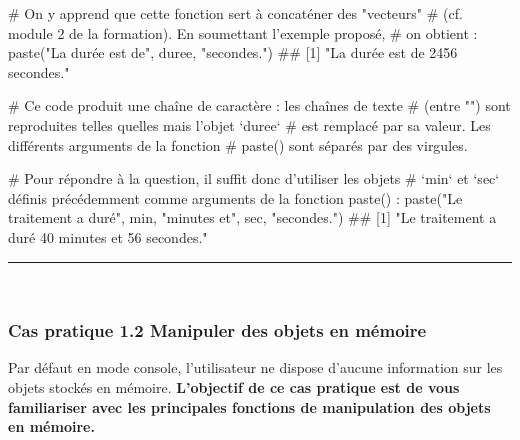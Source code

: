 \documentclass[12pt,twosided, notitlepage]{book}
\newenvironment{Shaded}{}{}
\newcommand{\KeywordTok}[1]{\textcolor[rgb]{0.00,0.00,1.00}{#1}}
\newcommand{\StringTok}[1]{\textcolor[rgb]{0.00,0.50,0.50}{#1}}
\newcommand{\CommentTok}[1]{\textcolor[rgb]{0.00,0.50,0.00}{#1}}
\newcommand{\NormalTok}[1]{#1}
\renewenvironment{Shaded}{\begin{snugshade}}{\end{snugshade}}
\begin{document}
\begin{enumerate}
\begin{Shaded}
\begin{Highlighting}[]
\CommentTok{# On y apprend que cette fonction sert à concaténer des "vecteurs"}
\CommentTok{# (cf. module 2 de la formation). En soumettant l'exemple proposé,}
\CommentTok{# on obtient :}
\KeywordTok{paste}\NormalTok{(}\StringTok{"La durée est de"}\NormalTok{, duree, }\StringTok{"secondes."}\NormalTok{)}
\NormalTok{  ## [1] "La durée est de 2456 secondes."}

\CommentTok{# Ce code produit une chaîne de caractère : les chaînes de texte}
\CommentTok{# (entre "") sont reproduites telles quelles mais l'objet `duree`}
\CommentTok{# est remplacé par sa valeur. Les différents arguments de la fonction}
\CommentTok{# paste() sont séparés par des virgules.}

\CommentTok{# Pour répondre à la question, il suffit donc d'utiliser les objets}
\CommentTok{# `min` et `sec` définis précédemment comme arguments de la fonction paste() :}
\KeywordTok{paste}\NormalTok{(}\StringTok{"Le traitement a duré"}\NormalTok{, min, }\StringTok{"minutes et"}\NormalTok{, sec, }\StringTok{"secondes."}\NormalTok{)}
\NormalTok{  ## [1] "Le traitement a duré 40 minutes et 56 secondes."}
\end{Highlighting}
\end{Shaded}

  \begin{center} \rule{0.5\linewidth}{\linethickness}\end{center}

  \bigskip  \fi 
\end{enumerate}

~

\subsubsection{\texorpdfstring{\textbf{Cas pratique 1.2} Manipuler des
objets en
mémoire}{Cas pratique 1.2 Manipuler des objets en mémoire}}\label{cas-pratique-1.2-manipuler-des-objets-en-memoire}

Par défaut en mode console, l'utilisateur ne dispose d'aucune
information sur les objets stockés en mémoire. \textbf{L'objectif de ce
cas pratique est de vous familiariser avec les principales fonctions de
manipulation des objets en mémoire.}
\end{document}
